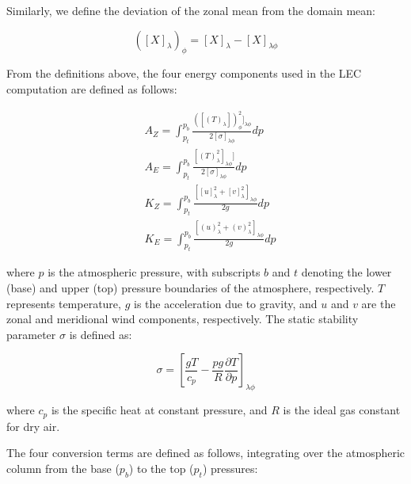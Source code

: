 \documentclass[pdflatex,sn-chicago]{sn-jnl}%
\theoremstyle{plain}
\theoremstyle{definition}
\theoremstyle{remark}
\theoremstyle{definition}
\begin{document}
Similarly, we define the deviation of the zonal mean from the domain mean:

\begin{equation}
    ([X]_\lambda)_\phi = [X]_\lambda - [X]_{\lambda\phi}
\end{equation}

From the definitions above, the four energy components used in the LEC computation are defined as follows:

\begin{align}
   &A_Z = \int_{p_t}^{p_b} \frac{([(T)_\lambda ])_\phi^{2}]_{\lambda \phi}}  {2[\sigma]_{\lambda \phi}} dp \label{eq:AZ} \\
   &A_E = \int_{p_t}^{p_b} \frac{[(T)_\lambda^{2}]_{\lambda \phi}]}  {2[\sigma]_{\lambda \phi}} dp \label{eq:AE} \\
   &K_Z =  \int_{p_t}^{p_b} \frac{[[u]_\lambda^2 + [v]_\lambda^2]_{\lambda \phi}}{2g} dp \label{eq:KZ} \\
   &K_E =  \int_{p_t}^{p_b} \frac{[(u)_\lambda^2 + (v)_\lambda^2]_{\lambda \phi}}{2g} dp \label{eq:KE}
\end{align}

where $p$ is the atmospheric pressure, with subscripts $b$ and $t$ denoting the lower (base) and upper (top) pressure boundaries of the atmosphere, respectively. $T$ represents temperature, $g$ is the acceleration due to gravity, and $u$ and $v$ are the zonal and meridional wind components, respectively. The static stability parameter $\sigma$ is defined as:


\begin{equation}
    \sigma = \left[\frac{gT}{c_p}-\frac{pg}{R}\frac{\partial T}{\partial p}\right]_{\lambda \phi}
\end{equation}

where $c_p$ is the specific heat at constant pressure, and $R$ is the ideal gas constant for dry air.


The four conversion terms are defined as follows, integrating over the atmospheric column from the base ($p_b$) to the top ($p_t$) pressures:
\end{document}
